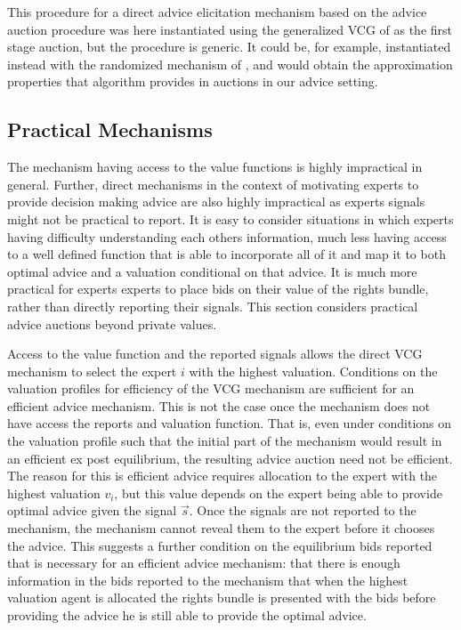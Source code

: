 This procedure for a direct advice elicitation mechanism based on the advice auction procedure was here instantiated using the generalized VCG of \citet{maskin1992auctions}  as the first stage auction, but the procedure is generic. It could be, for example, instantiated instead with the randomized mechanism of \citet{eden2018interdependent}, and would obtain the approximation properties that algorithm provides in auctions in our advice setting.


\subsection{Practical Mechanisms} 

The mechanism having access to the value functions is highly impractical in general. Further, direct mechanisms  in the context of motivating experts to provide decision making advice are also highly impractical as experts signals might not be practical to report. It is easy to consider situations in which experts having difficulty understanding each others information, much less having access to a well defined function that is able to incorporate all of it and map it to both optimal advice and a valuation conditional on that advice.
It is much more practical for experts experts to place bids on their value of the rights bundle, rather than directly reporting their signals. This section considers practical advice auctions beyond private values. 

Access to the value function and the reported signals allows the direct VCG mechanism to select the expert $i$ with the highest valuation. Conditions on the valuation profiles for efficiency of the VCG mechanism are  sufficient for an efficient advice mechanism.
This is not the case once the mechanism does not have access the reports and valuation function. That is, even under conditions on the valuation profile such that the initial part of the mechanism would result in an efficient ex post equilibrium, the resulting advice auction need not be efficient. The reason for this is efficient advice requires allocation to the expert with the highest valuation $v_i$, but this value depends on the expert being able to provide optimal advice given the signal $\vec{s}$. Once the signals are not reported to the mechanism, the mechanism cannot reveal them to the expert before it chooses the advice. This suggests a further condition on the equilibrium bids reported that is necessary for an efficient advice mechanism: that there is enough information in the bids reported to the mechanism that when the highest valuation agent is allocated the rights bundle is presented with the bids before providing the advice he is still able to provide the optimal advice.

